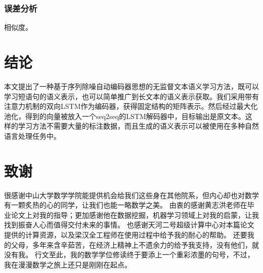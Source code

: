 \documentclass[UTF8,11pt,a4paper,nofonts]{ctexart}
\begin{document}
\subsubsection{误差分析}
相似度。




\section{结论}

本文提出了一种基于序列除噪自动编码器思想的无监督文本语义学习方法，既可以学习短语句的语义表示，也可以简单推广到长文本的语义表示获取。我们采用带有注意力机制的双向LSTM作为编码器，获得固定结构的矩阵表示。然后经过最大化池化，得到的向量被放入一个seq2seq的LSTM解码器中，目标输出是原文本。这样的学习方法不需要大量的标注数据，而且生成的语义表示可以被使用在多种自然语言处理任务中。


\section{致谢}

很感谢中山大学数学学院能提供机会给我们这些身在其他院系，但内心却也对数学有一颗炙热的心的同学，让我们也能一略数学之美。
由衷的感谢黄志洪老师在毕业论文上对我的指导；更加感谢他在数据挖掘，机器学习领域上对我的启蒙，让我找到振奋人心而值得交付未来的事情。
也感谢天河二号超级计算中心对本篇论文提供的计算资源，以及梁汉全工程师在使用过程中给予我的耐心的帮助。
还要我的父母，多年来含辛茹苦，在经济上精神上不遗余力的给予我支持，没有他们，就没有我。
行文至此，我的数学学位修读终于要添上一个重彩浓墨的句号，不过，我在漫漫数学之旅上还只是刚刚在起点。


\newpage
{}

\end{document}
